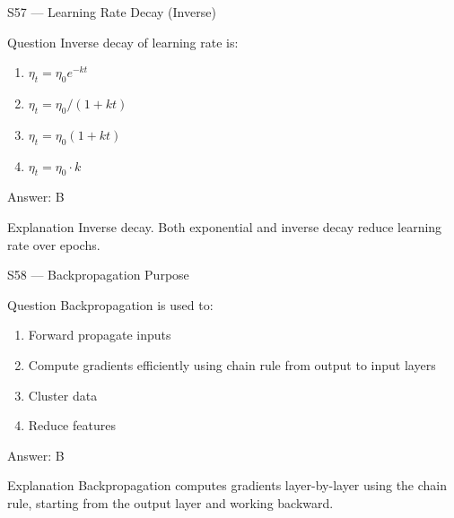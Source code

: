 \documentclass[aspectratio=169,8pt]{beamer}
\begin{document}
	\begin{frame}{S57 --- Learning Rate Decay (Inverse)}
		\begin{block}{Question}
			Inverse decay of learning rate is:
			\begin{enumerate}
				\item $\eta_t = \eta_0 e^{-kt}$
				\item $\eta_t = \eta_0/(1+kt)$
				\item $\eta_t = \eta_0(1+kt)$
				\item $\eta_t = \eta_0 \cdot k$
			\end{enumerate}
		\end{block}
		\begin{exampleblock}{Answer: B}\end{exampleblock}
		\begin{block}{Explanation}
			Inverse decay. Both exponential and inverse decay reduce learning rate over epochs.
		\end{block}
	\end{frame}
	
	\begin{frame}{S58 --- Backpropagation Purpose}
		\begin{block}{Question}
			Backpropagation is used to:
			\begin{enumerate}
				\item Forward propagate inputs
				\item Compute gradients efficiently using chain rule from output to input layers
				\item Cluster data
				\item Reduce features
			\end{enumerate}
		\end{block}
		\begin{exampleblock}{Answer: B}\end{exampleblock}
		\begin{block}{Explanation}
			Backpropagation computes gradients layer-by-layer using the chain rule, starting from the output layer and working backward.
		\end{block}
	\end{frame}
	
\end{document}
